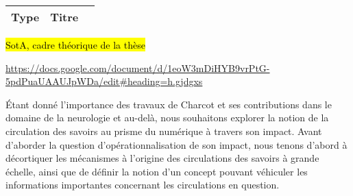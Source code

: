 \label{sect:sota}
\begin{table}[h]
	\centering
	\begin{tabularx}{\textwidth}{|>{\centering\arraybackslash}p{3.5cm}|>{\centering\arraybackslash}X|>{\centering\arraybackslash}X|}
		\hline
		Type & Titre &  \\
		\hline
	\end{tabularx}
\end{table}

\hl{SotA, cadre théorique de la thèse}

\url{https://docs.google.com/document/d/1eoW3mDiHYB9vrPtG-5pdPuaUAAUJpWDa/edit\#heading=h.gjdgxs}


Étant donné l'importance des travaux de Charcot et ses contributions dans le domaine de la neurologie et au-delà, nous souhaitons explorer la notion de la circulation des savoirs au prisme du numérique à travers son impact. Avant d'aborder la question d'opérationnalisation de son impact, nous tenons d'abord à décortiquer les mécanismes à l'origine des circulations des savoirs à grande échelle, ainsi que de définir la notion d'un \og{}concept\fg{} pouvant véhiculer les informations importantes concernant les circulations en question. 








